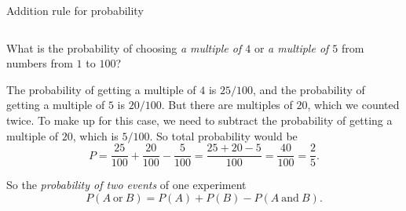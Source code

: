 \documentclass[9pt,aspectratio=169]{beamer}
\begin{document}
\begin{frame}{Addition rule for probability}
\begin{columns}[T]
\begin{column}{0.5\textwidth}
      \begin{problem}
        What is the probability of choosing \emph{a multiple of $4$} or \emph{a multiple of $5$} from numbers from $1$ to $100$?
      \end{problem}
      The probability of getting a multiple of $4$ is $25/100$, and the probability of getting a multiple of $5$ is $20/100$. But there are multiples of $20$, which we counted twice. To make up for this case, we need to subtract the probability of getting a multiple of $20$, which is $5/100$. So total probability would be
      \[
        P = \frac{25}{100} + \frac{20}{100} - \frac{5}{100} = \frac{25 + 20 - 5}{100} = \frac{40}{100} = \frac{2}{5}.
      \]
      \begin{definition}
        So the \emph{probability of two events} of one experiment
        \[ P(A\ \text{or}\ B) = P(A) + P(B) - P(A\ \text{and}\ B). \]
        \vspace*{-2.5ex}          
      \end{definition}
    \end{column}
  \end{columns}
\end{frame}
\end{document}
